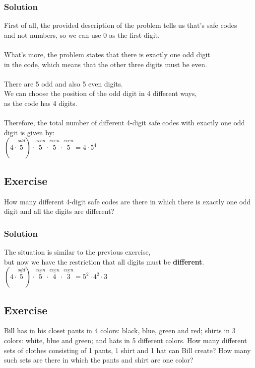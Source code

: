 \documentclass{article}
\begin{document}
\subsubsection*{Solution}
First of all, the provided description of the problem tells us that's safe codes\\
and not numbers, so we can use 0 as the first digit.\\
\\
What's more, the problem states that there is exactly one odd digit\\
in the code, which means that the other three digits must be even.\\
\\
There are 5 odd and also 5 even digits.
\\
We can choose the position of the odd digit in 4 different ways,\\
as the code has 4 digits.\\
\\
Therefore, the total number of different 4-digit safe codes with exactly one odd digit is given by:\\
$(4 \cdot \overset{odd}{\overline{5}}) \cdot \overset{even}{\overline{5}} \cdot \overset{even}{\overline{5}} \cdot \overset{even}{\overline{5}} = 4 \cdot 5^4$
\subsection{Exercise}
How many different 4-digit safe codes are there in which there is exactly one odd digit and all the digits are different?
\subsubsection*{Solution}
The situation is similar to the previous exercise,\\
but now we have the restriction that all digits must be \textbf{different}.\\
$(4 \cdot \overset{odd}{\overline{5}}) \cdot \overset{even}{\overline{5}} \cdot \overset{even}{\overline{4}} \cdot \overset{even}{\overline{3}} = 5^2 \cdot 4^2 \cdot 3$
\subsection{Exercise}
Bill has in his closet pants in 4 colors: black, blue, green and red; shirts in 3 colors: white, blue and green;
and hats in 5 different colors. How many different sets of clothes consisting of 1 pants, 1 shirt and 1 hat can Bill create?
How many such sets are there in which the pants and shirt are one color?
\end{document}
